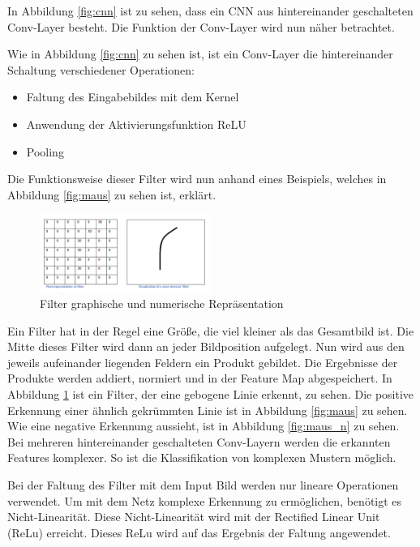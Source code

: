 In Abbildung \ref{fig:cnn} ist zu sehen, dass ein CNN aus hintereinander geschalteten Conv-Layer besteht. Die Funktion der Conv-Layer wird nun näher betrachtet.

Wie in Abbildung \ref{fig:cnn} zu sehen ist, ist ein Conv-Layer die hintereinander Schaltung verschiedener Operationen:
\begin{itemize}
 \item Faltung des Eingabebildes mit dem Kernel
 \item Anwendung der Aktivierungsfunktion ReLU
 \item Pooling
\end{itemize}
Die Funktionsweise dieser Filter wird nun anhand eines Beispiels, welches in Abbildung \ref{fig:maus} zu sehen ist, erklärt.

\begin{figure}[h]
  \centering
  \includegraphics[width=0.5\textwidth]{images/filter.pdf}
  \caption{Filter graphische und numerische Repräsentation \cite{github}}
  \label{fig:filter}
\end{figure}

Ein Filter hat in der Regel eine Größe, die viel kleiner als das Gesamtbild ist. Die Mitte dieses Filter wird dann an jeder Bildposition aufgelegt. Nun wird aus den jeweils aufeinander liegenden Feldern ein Produkt gebildet. Die Ergebnisse der Produkte werden addiert, normiert und in der Feature Map abgespeichert. In Abbildung \ref{fig:filter} ist ein Filter, der eine gebogene Linie erkennt, zu sehen. 
Die positive Erkennung einer ähnlich gekrümmten Linie ist in Abbildung \ref{fig:maus} zu sehen. Wie eine negative Erkennung aussieht, ist in Abbildung \ref{fig:maus_n} zu sehen. 
Bei mehreren hintereinander geschalteten Conv-Layern werden die erkannten Features komplexer. So ist die Klassifikation von komplexen Mustern möglich.

Bei der Faltung des Filter mit dem Input Bild werden nur lineare Operationen verwendet. Um mit dem Netz komplexe Erkennung zu ermöglichen, benötigt es Nicht-Linearität. Diese Nicht-Linearität wird mit der Rectified Linear Unit (ReLu) erreicht. Dieses ReLu wird auf das Ergebnis der Faltung angewendet. 

